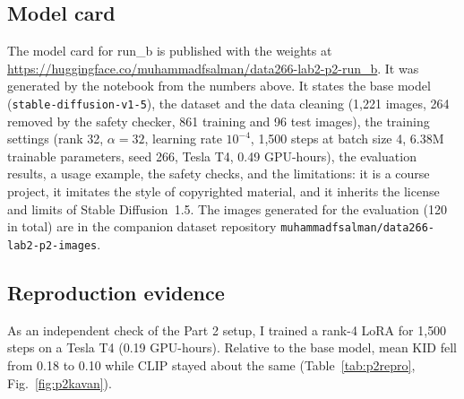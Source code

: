 \subsection{Model card}
The model card for run\_b is published with the weights at \url{https://huggingface.co/muhammadfsalman/data266-lab2-p2-run_b}. It was generated by the notebook from the numbers above. It states the base model (\texttt{stable-diffusion-v1-5}), the dataset and the data cleaning (1{,}221 images, 264 removed by the safety checker, 861 training and 96 test images), the training settings (rank 32, $\alpha=32$, learning rate $10^{-4}$, 1{,}500 steps at batch size 4, 6.38M trainable parameters, seed 266, Tesla T4, 0.49 GPU-hours), the evaluation results, a usage example, the safety checks, and the limitations: it is a course project, it imitates the style of copyrighted material, and it inherits the license and limits of Stable Diffusion~1.5. The images generated for the evaluation (120 in total) are in the companion dataset repository \texttt{muhammadfsalman/data266-lab2-p2-images}.

\subsection{Reproduction evidence}
As an independent check of the Part 2 setup, I trained a rank-4 LoRA for 1{,}500 steps on a Tesla T4 (0.19 GPU-hours). Relative to the base model, mean KID fell from 0.18 to 0.10 while CLIP stayed about the same (Table~\ref{tab:p2repro}, Fig.~\ref{fig:p2kavan}).
